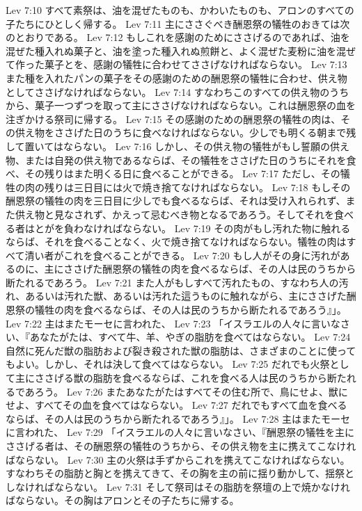 Lev 7:10  すべて素祭は、油を混ぜたものも、かわいたものも、アロンのすべての子たちにひとしく帰する。
Lev 7:11  主にささぐべき酬恩祭の犠牲のおきては次のとおりである。
Lev 7:12  もしこれを感謝のためにささげるのであれば、油を混ぜた種入れぬ菓子と、油を塗った種入れぬ煎餅と、よく混ぜた麦粉に油を混ぜて作った菓子とを、感謝の犠牲に合わせてささげなければならない。
Lev 7:13  また種を入れたパンの菓子をその感謝のための酬恩祭の犠牲に合わせ、供え物としてささげなければならない。
Lev 7:14  すなわちこのすべての供え物のうちから、菓子一つずつを取って主にささげなければならない。これは酬恩祭の血を注ぎかける祭司に帰する。
Lev 7:15  その感謝のための酬恩祭の犠牲の肉は、その供え物をささげた日のうちに食べなければならない。少しでも明くる朝まで残して置いてはならない。
Lev 7:16  しかし、その供え物の犠牲がもし誓願の供え物、または自発の供え物であるならば、その犠牲をささげた日のうちにそれを食べ、その残りはまた明くる日に食べることができる。
Lev 7:17  ただし、その犠牲の肉の残りは三日目には火で焼き捨てなければならない。
Lev 7:18  もしその酬恩祭の犠牲の肉を三日目に少しでも食べるならば、それは受け入れられず、また供え物と見なされず、かえって忌むべき物となるであろう。そしてそれを食べる者はとがを負わなければならない。
Lev 7:19  その肉がもし汚れた物に触れるならば、それを食べることなく、火で焼き捨てなければならない。犠牲の肉はすべて清い者がこれを食べることができる。
Lev 7:20  もし人がその身に汚れがあるのに、主にささげた酬恩祭の犠牲の肉を食べるならば、その人は民のうちから断たれるであろう。
Lev 7:21  また人がもしすべて汚れたもの、すなわち人の汚れ、あるいは汚れた獣、あるいは汚れた這うものに触れながら、主にささげた酬恩祭の犠牲の肉を食べるならば、その人は民のうちから断たれるであろう』」。
Lev 7:22  主はまたモーセに言われた、
Lev 7:23  「イスラエルの人々に言いなさい、『あなたがたは、すべて牛、羊、やぎの脂肪を食べてはならない。
Lev 7:24  自然に死んだ獣の脂肪および裂き殺された獣の脂肪は、さまざまのことに使ってもよい。しかし、それは決して食べてはならない。
Lev 7:25  だれでも火祭として主にささげる獣の脂肪を食べるならば、これを食べる人は民のうちから断たれるであろう。
Lev 7:26  またあなたがたはすべてその住む所で、鳥にせよ、獣にせよ、すべてその血を食べてはならない。
Lev 7:27  だれでもすべて血を食べるならば、その人は民のうちから断たれるであろう』」。
Lev 7:28  主はまたモーセに言われた、
Lev 7:29  「イスラエルの人々に言いなさい、『酬恩祭の犠牲を主にささげる者は、その酬恩祭の犠牲のうちから、その供え物を主に携えてこなければならない。
Lev 7:30  主の火祭は手ずからこれを携えてこなければならない。すなわちその脂肪と胸とを携えてきて、その胸を主の前に揺り動かして、揺祭としなければならない。
Lev 7:31  そして祭司はその脂肪を祭壇の上で焼かなければならない。その胸はアロンとその子たちに帰する。
